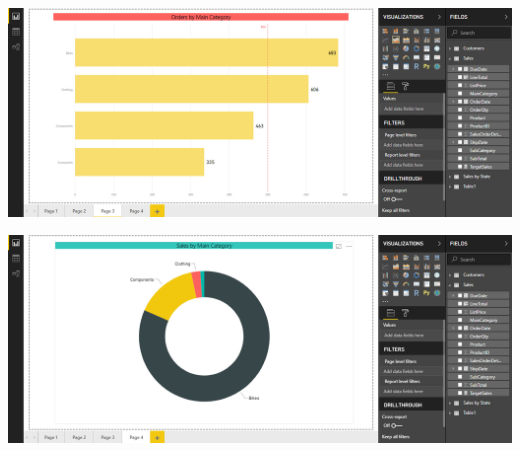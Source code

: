 	\begin{center}
	\includegraphics[width=18cm]{./Imagenes/Imagen15}
	\end{center}	
\newpage
	\begin{center}
	\includegraphics[width=18cm]{./Imagenes/Imagen16}
	\end{center}	

	
